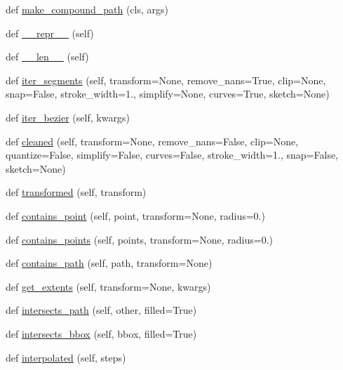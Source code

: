 \begin{DoxyCompactItemize}
\item 
def \hyperlink{classmatplotlib_1_1path_1_1Path_a7d24e4d289747430ff11d550d89be076}{make\+\_\+compound\+\_\+path} (cls, args)
\item 
def \hyperlink{classmatplotlib_1_1path_1_1Path_a09fbe795ff19e1f7c646f5c9e7a936ba}{\+\_\+\+\_\+repr\+\_\+\+\_\+} (self)
\item 
def \hyperlink{classmatplotlib_1_1path_1_1Path_a068953400e461d8790541cb2ab31df96}{\+\_\+\+\_\+len\+\_\+\+\_\+} (self)
\item 
def \hyperlink{classmatplotlib_1_1path_1_1Path_a350ad8cb300705d284206e471a2776ab}{iter\+\_\+segments} (self, transform=None, remove\+\_\+nans=True, clip=None, snap=False, stroke\+\_\+width=1., simplify=None, curves=True, sketch=None)
\item 
def \hyperlink{classmatplotlib_1_1path_1_1Path_a94de6154f565d95e26c57eab8aeec81e}{iter\+\_\+bezier} (self, kwargs)
\item 
def \hyperlink{classmatplotlib_1_1path_1_1Path_abce61e4078ff3c4d78f453cfa2295330}{cleaned} (self, transform=None, remove\+\_\+nans=False, clip=None, quantize=False, simplify=False, curves=False, stroke\+\_\+width=1., snap=False, sketch=None)
\item 
def \hyperlink{classmatplotlib_1_1path_1_1Path_acbbb3e1212913372ed4f428314404c92}{transformed} (self, transform)
\item 
def \hyperlink{classmatplotlib_1_1path_1_1Path_a4e421167fb76e408649b79f4ba4f11f5}{contains\+\_\+point} (self, point, transform=None, radius=0.)
\item 
def \hyperlink{classmatplotlib_1_1path_1_1Path_a0a8e16efd366cb77c64aeda4de05444d}{contains\+\_\+points} (self, points, transform=None, radius=0.)
\item 
def \hyperlink{classmatplotlib_1_1path_1_1Path_aff9468aab8094f1dff2fa551c60297a5}{contains\+\_\+path} (self, path, transform=None)
\item 
def \hyperlink{classmatplotlib_1_1path_1_1Path_ab62f364556740604c202f1453184212c}{get\+\_\+extents} (self, transform=None, kwargs)
\item 
def \hyperlink{classmatplotlib_1_1path_1_1Path_a6281e51d8ac1a760cadc0c8209a7da9d}{intersects\+\_\+path} (self, other, filled=True)
\item 
def \hyperlink{classmatplotlib_1_1path_1_1Path_a7fe543c6509ef4d0896638c9284d9274}{intersects\+\_\+bbox} (self, bbox, filled=True)
\item 
def \hyperlink{classmatplotlib_1_1path_1_1Path_aa92af2b6ec93ee82dcf60757ef308f00}{interpolated} (self, steps)

\end{DoxyCompactItemize}
